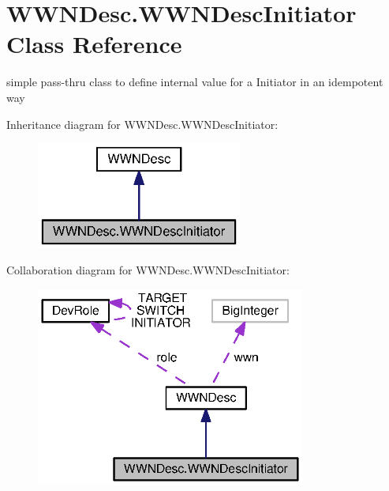 \section{W\+W\+N\+Desc.\+W\+W\+N\+Desc\+Initiator Class Reference}
\label{classorg_1_1smallfoot_1_1wwn_1_1WWNDesc_1_1WWNDescInitiator}


simple pass-\/thru class to define internal value for a Initiator in an idempotent way  




Inheritance diagram for W\+W\+N\+Desc.\+W\+W\+N\+Desc\+Initiator\+:\nopagebreak
\begin{figure}[H]
\begin{center}
\leavevmode
\includegraphics[width=192pt]{classorg_1_1smallfoot_1_1wwn_1_1WWNDesc_1_1WWNDescInitiator__inherit__graph}
\end{center}
\end{figure}


Collaboration diagram for W\+W\+N\+Desc.\+W\+W\+N\+Desc\+Initiator\+:\nopagebreak
\begin{figure}[H]
\begin{center}
\leavevmode
\includegraphics[width=251pt]{classorg_1_1smallfoot_1_1wwn_1_1WWNDesc_1_1WWNDescInitiator__coll__graph}
\end{center}
\end{figure}
